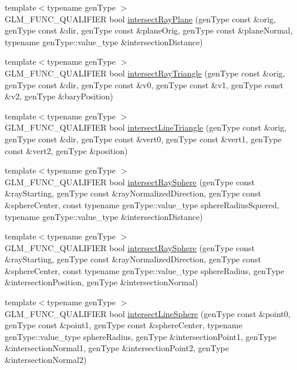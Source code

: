 \begin{DoxyCompactItemize}
\item 
{\footnotesize template$<$typename gen\-Type $>$ }\\G\-L\-M\-\_\-\-F\-U\-N\-C\-\_\-\-Q\-U\-A\-L\-I\-F\-I\-E\-R bool \hyperlink{group__gtx__intersect_gad3697a9700ea379739a667ea02573488}{intersect\-Ray\-Plane} (gen\-Type const \&orig, gen\-Type const \&dir, gen\-Type const \&plane\-Orig, gen\-Type const \&plane\-Normal, typename gen\-Type\-::value\-\_\-type \&intersection\-Distance)
\item 
{\footnotesize template$<$typename gen\-Type $>$ }\\G\-L\-M\-\_\-\-F\-U\-N\-C\-\_\-\-Q\-U\-A\-L\-I\-F\-I\-E\-R bool \hyperlink{group__gtx__intersect_gab16c1b47c10451e7604b51b39a7ef21d}{intersect\-Ray\-Triangle} (gen\-Type const \&orig, gen\-Type const \&dir, gen\-Type const \&v0, gen\-Type const \&v1, gen\-Type const \&v2, gen\-Type \&bary\-Position)
\item 
{\footnotesize template$<$typename gen\-Type $>$ }\\G\-L\-M\-\_\-\-F\-U\-N\-C\-\_\-\-Q\-U\-A\-L\-I\-F\-I\-E\-R bool \hyperlink{group__gtx__intersect_ga9d29b9b3acb504d43986502f42740df4}{intersect\-Line\-Triangle} (gen\-Type const \&orig, gen\-Type const \&dir, gen\-Type const \&vert0, gen\-Type const \&vert1, gen\-Type const \&vert2, gen\-Type \&position)
\item 
{\footnotesize template$<$typename gen\-Type $>$ }\\G\-L\-M\-\_\-\-F\-U\-N\-C\-\_\-\-Q\-U\-A\-L\-I\-F\-I\-E\-R bool \hyperlink{group__gtx__intersect_gac88f8cd84c4bcb5b947d56acbbcfa56e}{intersect\-Ray\-Sphere} (gen\-Type const \&ray\-Starting, gen\-Type const \&ray\-Normalized\-Direction, gen\-Type const \&sphere\-Center, const typename gen\-Type\-::value\-\_\-type sphere\-Radius\-Squered, typename gen\-Type\-::value\-\_\-type \&intersection\-Distance)
\item 
{\footnotesize template$<$typename gen\-Type $>$ }\\G\-L\-M\-\_\-\-F\-U\-N\-C\-\_\-\-Q\-U\-A\-L\-I\-F\-I\-E\-R bool \hyperlink{group__gtx__intersect_gad28c00515b823b579c608aafa1100c1d}{intersect\-Ray\-Sphere} (gen\-Type const \&ray\-Starting, gen\-Type const \&ray\-Normalized\-Direction, gen\-Type const \&sphere\-Center, const typename gen\-Type\-::value\-\_\-type sphere\-Radius, gen\-Type \&intersection\-Position, gen\-Type \&intersection\-Normal)
\item 
{\footnotesize template$<$typename gen\-Type $>$ }\\G\-L\-M\-\_\-\-F\-U\-N\-C\-\_\-\-Q\-U\-A\-L\-I\-F\-I\-E\-R bool \hyperlink{group__gtx__intersect_ga9c68139f3d8a4f3d7fe45f9dbc0de5b7}{intersect\-Line\-Sphere} (gen\-Type const \&point0, gen\-Type const \&point1, gen\-Type const \&sphere\-Center, typename gen\-Type\-::value\-\_\-type sphere\-Radius, gen\-Type \&intersection\-Point1, gen\-Type \&intersection\-Normal1, gen\-Type \&intersection\-Point2, gen\-Type \&intersection\-Normal2)

\end{DoxyCompactItemize}
